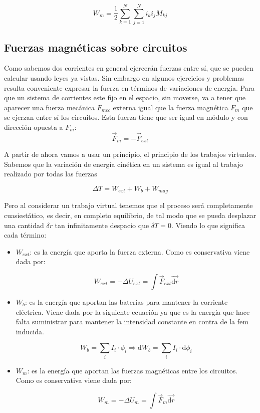 \documentclass[12pt]{article}
\newcommand{\D}{\mathrm{d}}
\begin{document}
\begin{equation}
W_m = \dfrac{1}{2} \sum_{k=1}^N  \sum_{j=1}^N i_k i_j M_{kj}
\end{equation}

\subsection{Fuerzas magnéticas sobre circuitos}

Como sabemos dos corrientes en general ejercerán fuerzas entre sí, que se pueden calcular usando leyes ya vistas. Sin embargo en algunos ejercicios y problemas resulta conveniente expresar la fuerza en términos de variaciones de energía. Para que un sistema de corrientes este fijo en el espacio, sin moverse, va a tener que aparecer una fuerza mecánica $F_{mec}$ externa igual que la fuerza magnética $F_m$ que se ejerzan entre sí los circuitos. Esta fuerza tiene que ser igual en módulo y con dirección opuesta a $F_m$: \\

\begin{equation}
\vec{F}_m = -  \vec{F}_{ext}
\end{equation}

A partir de ahora vamos a usar un principio, el principio de los trabajos virtuales. Sabemos que la variación de energía cinética en un sistema es igual al trabajo realizado por todas las fuerzas 

\begin{equation}
\Delta T = W_{ext} + W_{b} + W_{mag}
\end{equation}

Pero al considerar un trabajo virtual tenemos que el proceso será completamente cuasiestático, es decir, en completo equilibrio, de tal modo que se pueda desplazar una cantidad $\delta r$ tan infinitamente despacio que $\delta T = 0$. Viendo lo que significa cada término:

\begin{itemize}
\item $W_{ext}$: es la energía que aporta la fuerza externa. Como es conservativa viene dada por: 

$$W_{ext} = - \Delta U_{ext} = \int \vec{F}_{ext} \vec{\D r} $$

\item $W_{b}$: es la energía que aportan las baterías para mantener la corriente eléctrica. Viene dada por la siguiente ecuación ya que es la energía que hace falta suministrar para mantener la intensidad constante en contra de la fem inducida.

$$W_{b} = \sum_i I_i  \cdot \phi_i  \Longrightarrow \D W_b = \sum_i I_i \cdot \D \phi_i $$ 

\item $W_{m}$: es la energía que aportan las fuerzas magnéticas entre los circuitos. Como es conservativa viene dada por: 

$$W_{m} = - \Delta U_{m} = \int \vec{F}_{m} \vec{\D r} $$


\end{itemize}
\end{document}
